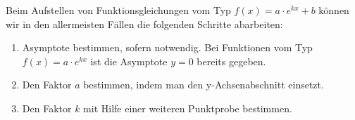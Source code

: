 Beim Aufstellen von Funktionsgleichungen vom Typ \(f(x)=a\cdot e^{kx}+b\) können wir in den allermeisten Fällen die folgenden Schritte abarbeiten:
\begin{enumerate}[label=\arabic*)]
	\item Asymptote bestimmen, sofern notwendig. Bei Funktionen vom Typ \(f(x)=a\cdot e^{kx}\) ist die Asymptote \(y=0\) bereits gegeben.
	\item Den Faktor \(a\) bestimmen, indem man den y-Achsenabschnitt einsetzt.
	\item Den Faktor \(k\) mit Hilfe einer weiteren Punktprobe bestimmen.
\end{enumerate}

\medskip

